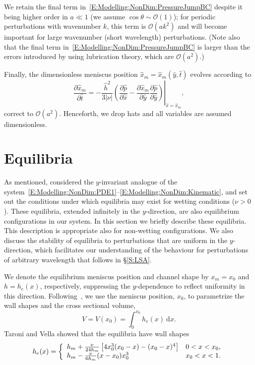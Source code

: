 \documentclass{jfm}
\newcommand{\ddp}[2]{\frac{\partial #1}{\partial #2}}
\newcommand{\aspect}{a} %
\newcommand{\h}{h}
\newcommand{\x}{x}
\begin{document}
We retain the final term in~\eqref{E:Modelling:NonDim:PressureJumpBC} despite it being higher order in $\aspect \ll 1$ (we assume $\cos \theta \sim \mathcal{O}(1)$); for periodic perturbations with wavenumber $k$, this term is $\mathcal{O}(\aspect k^2)$ and will become important for large wavenumber (short wavelength) perturbations. (Note also that the final term in~\eqref{E:Modelling:NonDim:PressureJumpBC} is larger than the errors introduced by using lubrication theory, which are $\mathcal{O}(\aspect^2)$.)

Finally, the dimensionless meniscus position $\hat{x}_m = \hat{x}_m(\hat{y}, \hat{t})$ evolves according to
\begin{equation}\label{E:Modelling:NonDim:Kinematic}
\ddp{ \hat{x} _m}{\hat{t}} = -\left.\frac{\hat{h}^2}{3|\nu|}\left(\ddp{\hat{p}}{\hat{x}} - \ddp{\hat{x}_m}{\hat{y}}\ddp{\hat{p}}{\hat{y}} \right)  \right|_{\hat{x} = \hat{x}_m},
\end{equation}
correct to $\mathcal{O}(\aspect^2)$. Henceforth, we drop hats and all variables are assumed dimensionless. 


\section{Equilibria}\label{S:Equilibria}
As mentioned, \citet{Taroni2012JFM} considered the $y$-invariant analogue of the system~\eqref{E:Modelling:NonDim:PDE1}--\eqref{E:Modelling:NonDim:Kinematic}, and set out the conditions under which equilibria may exist for wetting conditions ($\nu > 0$). These equilibria, extended infinitely in the $y$-direction, are also equilibrium configurations in our system. In this section we briefly describe these equilibria. This description is appropriate also for non-wetting configurations. We also discuss the stability of equilibria to perturbations that are uniform in  the $y$-direction, which facilitates our understanding of the behaviour for perturbations of arbitrary wavelength that follows in \S\ref{S:LSA}. 

We denote the equilibrium meniscus position and channel shape by $x_m = x_0$ and $h = h_e(x)$, respectively, suppressing the $y$-dependence to reflect uniformity in this direction. Following~\citet{Taroni2012JFM}, we use the meniscus position, $x_0$, to parametrize the wall shapes and the cross sectional volume,
\begin{equation}\label{E:Equilibria:Volume}
V  = V(x_0) = \int_{0}^{x_0} h_e(x)~\mathrm{d}x.
\end{equation}
Taroni and Vella showed that the equilibria have wall shapes
\begin{equation}\label{E:Equilibria:EqShape}
\h_e(\x) = \left\{\begin{array}{l l}
 \h_m+ \frac{\nu}{24 \h_m}\left[4 x_0^3( \x_0 - \x) - ( \x_0 - \x)^4\right] &  0 < \x <  \x_0, \\
 \h_m -\frac{\nu }{6 h_m}(\x - \x_0) \x_0^3 & \x_0 < \x < 1.
\end{array}\right.
\end{equation}
\end{document}
